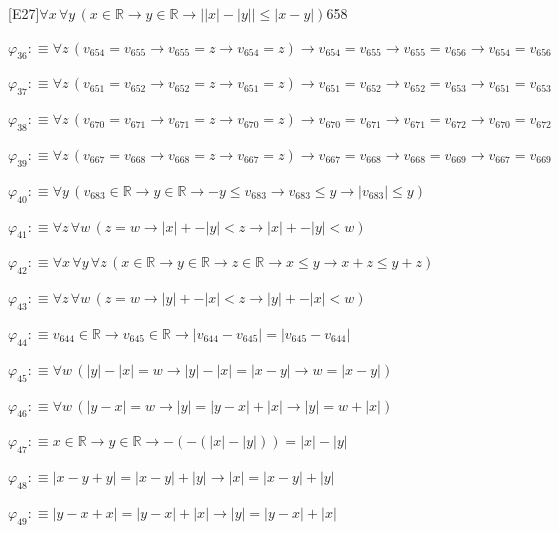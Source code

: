 \begin{fullproof}{[E27]}{$\forall x\,\forall y\,(x \in \mathbb{R} \to y \in \mathbb{R} \to \lvert \lvert x \rvert - \lvert y \rvert \rvert \leq \lvert x - y \rvert)$}{658}
\begin{abbrevlist}
\item $\varphi_{36} :\equiv \forall z\,(v_{654} = v_{655} \to v_{655} = z \to v_{654} = z) \to v_{654} = v_{655} \to v_{655} = v_{656} \to v_{654} = v_{656}$
\item $\varphi_{37} :\equiv \forall z\,(v_{651} = v_{652} \to v_{652} = z \to v_{651} = z) \to v_{651} = v_{652} \to v_{652} = v_{653} \to v_{651} = v_{653}$
\item $\varphi_{38} :\equiv \forall z\,(v_{670} = v_{671} \to v_{671} = z \to v_{670} = z) \to v_{670} = v_{671} \to v_{671} = v_{672} \to v_{670} = v_{672}$
\item $\varphi_{39} :\equiv \forall z\,(v_{667} = v_{668} \to v_{668} = z \to v_{667} = z) \to v_{667} = v_{668} \to v_{668} = v_{669} \to v_{667} = v_{669}$
\item $\varphi_{40} :\equiv \forall y\,(v_{683} \in \mathbb{R} \to y \in \mathbb{R} \to -y \leq v_{683} \to v_{683} \leq y \to \lvert v_{683} \rvert \leq y)$
\item $\varphi_{41} :\equiv \forall z\,\forall w\,(z = w \to \lvert x \rvert + -\lvert y \rvert < z \to \lvert x \rvert + -\lvert y \rvert < w)$
\item $\varphi_{42} :\equiv \forall x\,\forall y\,\forall z\,(x \in \mathbb{R} \to y \in \mathbb{R} \to z \in \mathbb{R} \to x \leq y \to x + z \leq y + z)$
\item $\varphi_{43} :\equiv \forall z\,\forall w\,(z = w \to \lvert y \rvert + -\lvert x \rvert < z \to \lvert y \rvert + -\lvert x \rvert < w)$
\item $\varphi_{44} :\equiv v_{644} \in \mathbb{R} \to v_{645} \in \mathbb{R} \to \lvert v_{644} - v_{645} \rvert = \lvert v_{645} - v_{644} \rvert$
\item $\varphi_{45} :\equiv \forall w\,(\lvert y \rvert - \lvert x \rvert = w \to \lvert y \rvert - \lvert x \rvert = \lvert x - y \rvert \to w = \lvert x - y \rvert)$
\item $\varphi_{46} :\equiv \forall w\,(\lvert y - x \rvert = w \to \lvert y \rvert = \lvert y - x \rvert + \lvert x \rvert \to \lvert y \rvert = w + \lvert x \rvert)$
\item $\varphi_{47} :\equiv x \in \mathbb{R} \to y \in \mathbb{R} \to -(-(\lvert x \rvert - \lvert y \rvert)) = \lvert x \rvert - \lvert y \rvert$
\item $\varphi_{48} :\equiv \lvert x - y + y \rvert = \lvert x - y \rvert + \lvert y \rvert \to \lvert x \rvert = \lvert x - y \rvert + \lvert y \rvert$
\item $\varphi_{49} :\equiv \lvert y - x + x \rvert = \lvert y - x \rvert + \lvert x \rvert \to \lvert y \rvert = \lvert y - x \rvert + \lvert x \rvert$

\end{abbrevlist}
\end{fullproof}
